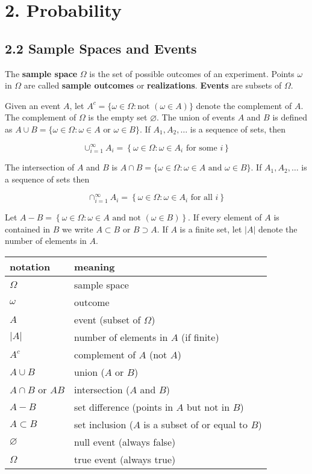 \section*{2. Probability}\label{probability}

\subsection*{2.2 Sample Spaces and Events}\label{sample-spaces-and-events}

The \textbf{sample space} \(\Omega\) is the set of possible outcomes of an experiment. Points \(\omega\) in \(\Omega\) are called \textbf{sample outcomes} or \textbf{realizations}. \textbf{Events} are subsets of \(\Omega\).

Given an event \(A\), let \(A^{c} = \{ \omega \in \Omega : \text{not } (\omega \in A) \}\) denote the complement of \(A\). The complement of \(\Omega\) is the empty set \(\varnothing\). The union of events \(A\) and \(B\) is defined as \(A \cup B = \{ \omega \in \Omega : \omega \in A \text{ or } \omega \in B \}\). If \(A_{1}, A_{2}, \dots\) is a sequence of sets, then

\[ 
\cup_{i=1}^{\infty} A_{i} = \left\{ \omega \in \Omega : \omega \in A_{i} \text{ for some } i \right\}
\]

The intersection of \(A\) and \(B\) is 
\(A \cap B = \{ \omega \in \Omega : \omega \in A \text{ and } \omega \in B \}\).
If \(A_{1}, A_{2}, \dots\) is a sequence of sets then

\[ 
\cap_{i=1}^{\infty} A_{i} = \left\{ \omega \in \Omega : \omega \in A_{i} \text{ for all } i \right\}
\]

Let
\(A - B = \left\{ \omega \in \Omega : \omega \in A \text{ and not } (\omega \in B) \right\}\).
If every element of \(A\) is contained in \(B\) we write \(A \subset B\) or \(B \supset A\). If \(A\) is a finite set, let \(|A|\) denote the number of elements in \(A\).

\begin{table}[H]
\centering
\begin{tabular}{@{}p{5cm}p{10cm}@{}}
\toprule
notation &  meaning  \\
\midrule
\(\Omega\) & sample space \\
\(\omega\) & outcome \\
\(A\) & event (subset of \(\Omega\)) \\
\(\vert A \vert\) & number of elements in \(A\) (if finite) \\
\(A^{c}\) & complement of \(A\) (not \(A\)) \\
\(A \cup B\) & union (\(A\) or \(B\)) \\
\(A \cap B\) or \(AB\) & intersection (\(A\) and \(B\)) \\
\(A - B\) & set difference (points in \(A\) but not in \(B\)) \\
\(A \subset B\) & set inclusion (\(A\) is a subset of or equal to
\(B\)) \\
\(\varnothing\) & null event (always false) \\
\(\Omega\) & true event (always true) \\
\bottomrule
\end{tabular}
\end{table}

